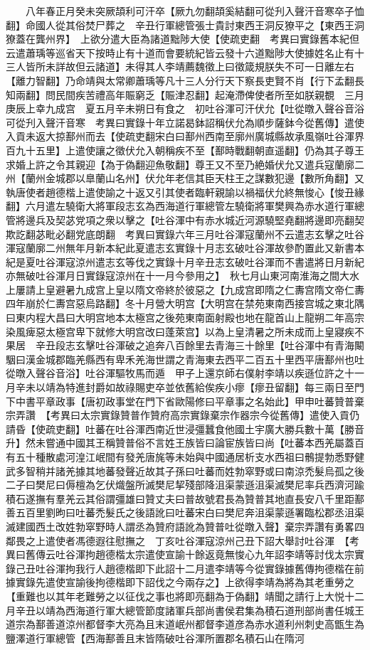 　　八年春正月癸未突厥頡利可汗卒【厥九勿翻頡奚結翻可從刋入聲汗音寒卒子恤翻】命國人從其俗焚尸葬之　辛丑行軍總管張士貴討東西王洞反獠平之【東西王洞獠蓋在龔州界】　上欲分遣大臣為諸道黜陟大使【使疏吏翻　考異曰實錄舊本紀但云遣蕭瑀等巡省天下按時止有十道而會要統紀皆云發十六道黜陟大使據姓名止有十三人皆所未詳故但云諸道】未得其人李靖薦魏徵上曰徵箴規朕失不可一日離左右【離力智翻】乃命靖與太常卿蕭瑀等凡十三人分行天下察長吏賢不肖【行下孟翻長知兩翻】問民間疾苦禮高年賑窮乏【賑津忍翻】起淹滯俾使者所至如朕親覩　三月庚辰上幸九成宫　夏五月辛未朔日有食之　初吐谷渾可汗伏允【吐從暾入聲谷音浴可從刋入聲汗音寒　考異曰實錄十年立諾曷鉢詔稱伏允為順步薩鉢今從舊傳】遣使入貢未返大掠鄯州而去【使疏吏翻宋白曰鄯州西南至廓州廣城縣故承風嶺吐谷渾界百九十五里】上遣使讓之徵伏允入朝稱疾不至【鄯時戰翻朝直遥翻】仍為其子尊王求婚上許之令其親迎【為于偽翻迎魚敬翻】尊王又不至乃絶婚伏允又遣兵寇蘭廓二州【蘭州金城郡以臯蘭山名州】伏允年老信其臣天柱王之謀數犯邊【數所角翻】又執唐使者趙德楷上遣使諭之十返又引其使者臨軒親諭以禍福伏允終無悛心【悛丑緣翻】六月遣左驍衛大將軍段志玄為西海道行軍總管左驍衛將軍樊興為赤水道行軍總管將邊兵及契苾党項之衆以擊之【吐谷渾中有赤水城近河源驍堅堯翻將邊即亮翻契欺訖翻苾毗必翻党底朗翻　考異曰實錄六年三月吐谷渾寇蘭州不云遣志玄擊之吐谷渾寇蘭廓二州無年月新本紀此夏遣志玄實錄十月志玄破吐谷渾故參酌置此又新書本紀是夏吐谷渾寇涼州遣志玄等伐之實錄十月辛丑志玄破吐谷渾而不書遣將日月新紀亦無破吐谷渾月日實錄寇涼州在十一月今參用之】　秋七月山東河南淮海之間大水　上屢請上皇避暑九成宫上皇以隋文帝終於彼惡之【九成宫即隋之仁夀宫隋文帝仁夀四年崩於仁夀宫惡烏路翻】冬十月營大明宫【大明宫在禁苑東南西接宫城之東北隅曰東内程大昌曰大明宫地本太極宫之後苑東南面射殿也地在龍首山上龍朔二年高宗染風痺惡太極宫卑下就修大明宫改曰蓬萊宫】以為上皇清暑之所未成而上皇寢疾不果居　辛丑段志玄擊吐谷渾破之追奔八百餘里去青海三十餘里【吐谷渾中有青海闞駰曰漢金城郡臨羌縣西有卑禾羌海世謂之青海東去西平二百五十里西平唐鄯州也吐從暾入聲谷音浴】吐谷渾驅牧馬而遁　甲子上還京師右僕射李靖以疾遜位許之十一月辛未以靖為特進封爵如故祿賜吏卒並依舊給俟疾小瘳【瘳丑留翻】每三兩日至門下中書平章政事【唐初政事堂在門下省歐陽修曰平章事之名始此】甲申吐蕃贊普棄宗弄讚　【考異曰太宗實錄贊普作贊府高宗實錄棄宗作器宗今從舊傳】遣使入貢仍請昏【使疏吏翻】吐蕃在吐谷渾西南近世浸彊蠶食他國土宇廣大勝兵數十萬【勝音升】然未嘗通中國其王稱贊普俗不言姓王族皆曰論宦族皆曰尚【吐蕃本西羌屬蓋百有五十種散處河湟江岷間有發羌唐旄等未始與中國通居析支水西祖曰鶻提勃悉野健武多智稍并諸羌據其地蕃發聲近故其子孫曰吐蕃而姓勃窣野或曰南涼禿髮烏孤之後二子曰樊尼曰傉檀為乞伏熾盤所滅樊尼挈殘部降沮渠蒙遜沮渠滅樊尼率兵西濟河踰積石遂撫有羣羌云其俗謂彊雄曰贊丈夫曰普故號君長為贊普其地直長安八千里距鄯善五百里劉昫曰吐蕃禿髮氏之後語訛曰吐蕃宋白曰樊尼奔沮渠蒙遜署臨松郡丞沮渠滅建國西土改姓勃窣野時人謂丞為贊府語訛為贊普吐從暾入聲】棄宗弄讚有勇畧四鄰畏之上遣使者馮德遐往慰撫之　丁亥吐谷渾寇涼州己丑下詔大舉討吐谷渾　【考異曰舊傳云吐谷渾拘趙德楷太宗遣使宣諭十餘返竟無悛心九年詔李靖等討伐太宗實錄己丑吐谷渾拘我行人趙德楷即下此詔十二月遣李靖等今從實錄據舊傳拘德楷在前據實錄先遣使宣諭後拘德楷即下詔伐之今兩存之】上欲得李靖為將為其老重勞之【重難也以其年老難勞之以征伐之事也將即亮翻為于偽翻】靖聞之請行上大悦十二月辛丑以靖為西海道行軍大總管節度諸軍兵部尚書侯君集為積石道刑部尚書任城王道宗為鄯善道涼州都督李大亮為且末道岷州都督李道彦為赤水道利州刺史高甑生為鹽澤道行軍總管【西海鄯善且末皆隋破吐谷渾所置郡名積石山在隋河